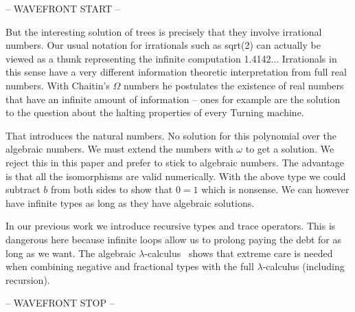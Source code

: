 \documentclass[preprint]{sigplanconf}
\begin{document}
-- WAVEFRONT START --

But the interesting solution of trees is precisely that they involve
irrational numbers. Our usual notation for irrationals such as
{{sqrt(2) }} can actually be viewed as a thunk representing the
infinite computation {{1.4142..}}.  Irrationals in this sense have a
very different information theoretic interpretation from full real
numbers.  With Chaitin's $\Omega$ numbers
\cite{Chaitin:1975:TPS:321892.321894} he postulates the existence of
real numbers that have an infinite amount of information -- ones for
example are the solution to the question about the halting properties
of every Turning machine.

That introduces the natural numbers. No solution for this polynomial
over the algebraic numbers. We must extend the numbers with $\omega$
to get a solution. We reject this in this paper and prefer to stick to
algebraic numbers. The advantage is that all the isomorphisms are
valid numerically. With the above type we could subtract $b$ from both
sides to show that $0=1$ which is nonsense. We can however have
infinite types as long as they have algebraic solutions.

In our previous work we introduce recursive types and trace
operators. This is dangerous here because infinite loops allow us to
prolong paying the debt for as long as we want. The algebraic
$\lambda$-calculus~\cite{Vaux:2009:ALC:1630585.1630590} shows that
extreme care is needed when combining negative and fractional types
with the full $\lambda$-calculus (including recursion).


-- WAVEFRONT STOP --



\end{document}
